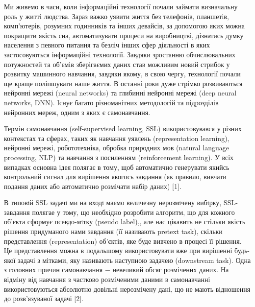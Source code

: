 
\hspace*{26pt}
Ми живемо в часи, коли інформаційні технології почали займати визначальну роль у житті людства. Зараз важко уявити життя без телефонів, планшетів, комп'ютерів, розумних годинників та інших девайсів, за допомогою яких можна покращити якість сна, автоматизувати процеси на виробництві, дізнатись думку населення з певного питання та безліч інших сфер діяльності в яких застосовуються інформаційні технології. Завдяки зростанню обчислювальних потужностей та об'ємів зберігаємих даних став можливим новий стрибок у розвитку машинного навчання, завдяки якому, в свою чергу, технології почали ще краще поліпшувати наше життя. В останні роки дуже стрімко розвиваються нейронні мережі (neural networks) та глибинні нейронні мережі (deep neural networks, DNN). Існує багато різноманітних методологій та підрозділів нейронних мереж, одним з яких є самонавчання.

Термін самонавчання (self-supervised learning, SSL) використовувався у різних контекстах та сферах, таких як навчання уявлень (representation learning), нейронні мережі, робототехніка, обробка природних мов (natural language processing, NLP) та навчання з посиленням (reinforcement learning). У всіх випадках основна ідея полягає в тому, щоб автоматично генерувати якийсь контрольний сигнал для вирішення якогось завдання (як правило, вивчати подання даних або автоматично розмічати набір даних) [1].

В типовiй SSL задачi ми на входi маємо величезну нерозмiчену вибiрку, SSL-завдання полягае у тому, що необхiдно розробити алгоритм, що для кожного об’єкта сформує псевдо-мiтку (pseudo label),, але нас цікавить не стільки якість рішення придуманого нами завдання (її називають pretext task), скільки представлення (representation) об'єктів, яке буде вивчено в процесі її рішення. Це представлення можна в подальшому використовувати вже при вирішенні будь-якої задачі з мітками, яку називають наступною задачею (downstream task). Одна з головних причин самонавчання $-$ невеликий обсяг розмічених даних. На відміну від навчання з частково розміченими даними в самонавчанні використовуються абсолютно довільні нерозмічену дані, що не мають відношення до розв'язуваної задачі [2].

